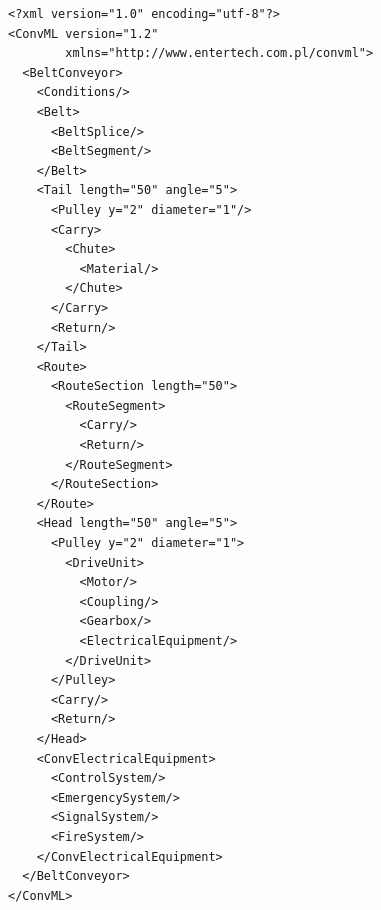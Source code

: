 \documentclass[12pt,a4paper]{article}
\begin{document}
\begin{verbatim}
<?xml version="1.0" encoding="utf-8"?>
<ConvML version="1.2"
        xmlns="http://www.entertech.com.pl/convml">
  <BeltConveyor>
    <Conditions/>
    <Belt>
      <BeltSplice/>
      <BeltSegment/>
    </Belt>
    <Tail length="50" angle="5">
      <Pulley y="2" diameter="1"/>
      <Carry>
        <Chute>
          <Material/>
        </Chute>
      </Carry>
      <Return/>
    </Tail>
    <Route>
      <RouteSection length="50">
        <RouteSegment>
          <Carry/>
          <Return/>
        </RouteSegment>
      </RouteSection>
    </Route>
    <Head length="50" angle="5">
      <Pulley y="2" diameter="1">
        <DriveUnit>
          <Motor/>
          <Coupling/>
          <Gearbox/>
          <ElectricalEquipment/>
        </DriveUnit>
      </Pulley>
      <Carry/>
      <Return/>
    </Head>
    <ConvElectricalEquipment>
      <ControlSystem/>
      <EmergencySystem/>
      <SignalSystem/>
      <FireSystem/>
    </ConvElectricalEquipment>
  </BeltConveyor>
</ConvML>
\end{verbatim}



\end{document}
